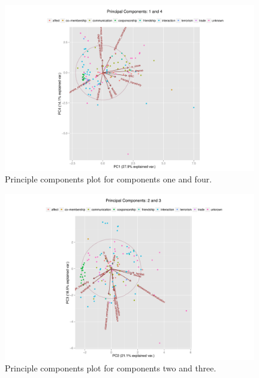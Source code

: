 \documentclass[3p,times]{elsarticle}
\begin{document}
\begin{figure}
\begin{center}
	\caption{\label{fig:1 and 4} Principle components plot for components one and four.}
		\includegraphics[width = 0.98\textwidth]{./images/Observed_PCA_Components1_4.pdf}
\end{center}
\end{figure}

\begin{figure}
\begin{center}
	\caption{\label{fig:2 and 3} Principle components plot for components two and three.}
		\includegraphics[width = 0.98\textwidth]{./images/Observed_PCA_Components2_3.pdf}
\end{center}
\end{figure}
\end{document}
